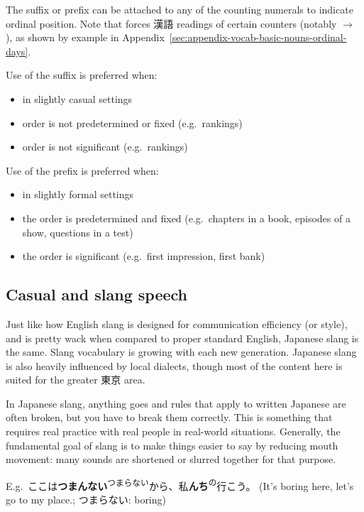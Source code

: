 \documentclass[../nihongo-gakushuu-kyouzai-grammar.tex]{subfiles}
\begin{document}
The  suffix or  prefix can be attached to any of the counting numerals to indicate ordinal position. Note that  forces 漢語 readings of certain counters (notably  $\to$ ), as shown by example in Appendix~\ref{sec:appendix-vocab-basic-nouns-ordinal-days}.

Use of the  suffix is preferred when:
\begin{itemize}
    \item in slightly casual settings
    \item order is not predetermined or fixed (e.g.\ rankings)
    \item order is not significant (e.g.\ rankings)
\end{itemize}

Use of the  prefix is preferred when:
\begin{itemize}
    \item in slightly formal settings
    \item the order is predetermined and fixed (e.g.\ chapters in a book, episodes of a show, questions in a test)
    \item the order is significant (e.g.\ first impression, first bank)
\end{itemize}


\subsection{Casual and slang speech} \label{sec:casual-and-slang-speech}
Just like how English slang is designed for communication efficiency (or style), and is pretty wack when compared to proper standard English, Japanese slang is the same. Slang vocabulary is growing with each new generation. Japanese slang is also heavily influenced by local dialects, though most of the content here is suited for the greater 東京 area.

In Japanese slang, anything goes and rules that apply to written Japanese are often broken, but you have to break them correctly. This is something that requires real practice with real people in real-world situations. Generally, the fundamental goal of slang is to make things easier to say by reducing mouth movement: many sounds are shortened or slurred together for that purpose.

E.g.\ ここは\textbf{つまんない}\textsuperscript{つまらない}から、私\textbf{んち}\textsuperscript{の}行こう。 (It's boring here, let's go to my place.; つまらない: boring)
\end{document}
